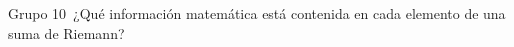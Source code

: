 \documentclass[preview]{standalone}
\begin{document}
\begin{center}
Grupo 10\ ¿Qué información matemática está contenida en cada elemento de una suma de Riemann?
\end{center}
\end{document}
